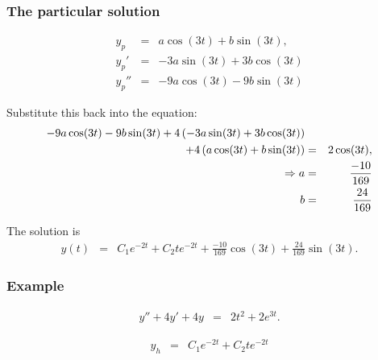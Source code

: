 \begin{frame}
  \frametitle{The particular solution}

  \begin{eqnarray*}
    y_p & = & a \cos(3t) + b \sin(3t), \\
    y_p' & = & -3 a \sin(3t) + 3b \cos(3t) \\
    y_p'' & = & -9 a \cos(3t) - 9b \sin(3t)
  \end{eqnarray*}

  Substitute this back into the equation:
  \begin{eqnarray*}
    -9 a \cos(3t) - 9b \sin(3t) 
    + 4 \left( -3 a \sin(3t) + 3b \cos(3t) \right) & & \\
    + 4 \left( a \cos(3t) + b \sin(3t) \right)
     & = & 2 \cos(3t), \\
    \Rightarrow 
    a & = & \frac{-10}{169} \\
    b & = & \frac{24}{169}
  \end{eqnarray*}

  The solution is 
  \begin{eqnarray*}
    y(t) & = & C_1 e^{-2t} + C_2 t e^{-2t} + \frac{-10}{169}\cos(3t) +
    \frac{24}{169} \sin(3t).
  \end{eqnarray*}

\end{frame}


\begin{frame}
  \frametitle{Example}

  \begin{eqnarray*}
    y'' + 4y' + 4y & = & 2t^2 + 2 e^{3t}.
  \end{eqnarray*}

  {
    \begin{eqnarray*}
      y_h & = & C_1 e^{-2t} + C_2 t e^{-2t}
    \end{eqnarray*}
  }

\end{frame}


